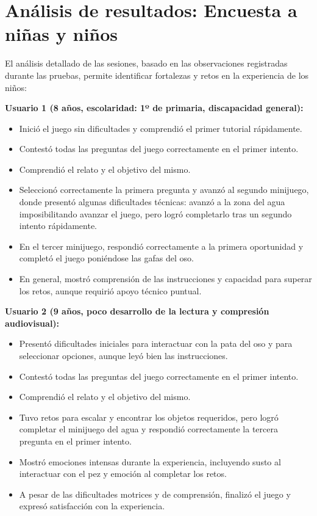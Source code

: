 \section{Análisis de resultados: Encuesta a niñas y niños}

El análisis detallado de las sesiones, basado en las observaciones registradas durante las pruebas, permite identificar fortalezas y retos en la experiencia de los niños:

\textbf{Usuario 1 (8 años, escolaridad: 1º de primaria, discapacidad general):}
\begin{itemize}
    \item Inició el juego sin dificultades y comprendió el primer tutorial rápidamente.
    \item Contestó todas las preguntas del juego correctamente en el primer intento.
    \item Comprendió el relato y el objetivo del mismo.
    \item Seleccionó correctamente la primera pregunta y avanzó al segundo minijuego, donde presentó algunas dificultades técnicas: avanzó a la zona del agua imposibilitando avanzar el juego, pero logró completarlo tras un segundo intento rápidamente.
    \item En el tercer minijuego, respondió correctamente a la primera oportunidad y completó el juego poniéndose las gafas del oso.
    \item En general, mostró comprensión de las instrucciones y capacidad para superar los retos, aunque requirió apoyo técnico puntual.
\end{itemize}

\textbf{Usuario 2 (9 años, poco desarrollo de la lectura y compresión audiovisual):}
\begin{itemize}
    \item Presentó dificultades iniciales para interactuar con la pata del oso y para seleccionar opciones, aunque leyó bien las instrucciones.
    \item Contestó todas las preguntas del juego correctamente en el primer intento.
    \item Comprendió el relato y el objetivo del mismo.
    \item Tuvo retos para escalar y encontrar los objetos requeridos, pero logró completar el minijuego del agua y respondió correctamente la tercera pregunta en el primer intento.
    \item Mostró emociones intensas durante la experiencia, incluyendo susto al interactuar con el pez y emoción al completar los retos.
    \item A pesar de las dificultades motrices y de comprensión, finalizó el juego y expresó satisfacción con la experiencia.
\end{itemize}

